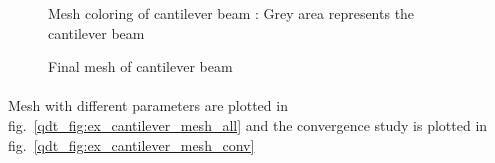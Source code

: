     \begin{figure}
        \centering
        \caption[Mesh coloring of cantilever beam]{Mesh coloring of cantilever beam : Grey area represents the cantilever beam}
        \label{qdt_fig:ex_cantilever_beam_mesh_coloring}
    \end{figure}

    \begin{figure}
        \centering
        \caption[Final mesh of cantilever beam]{Final mesh of cantilever beam}
        \label{qdt_fig:ex_cantilever_beam_mesh_final}
    \end{figure}
\paragraph{}
Mesh with different parameters are plotted in fig.~\ref{qdt_fig:ex_cantilever_mesh_all} and the convergence study is plotted in fig.~\ref{qdt_fig:ex_cantilever_mesh_conv}

